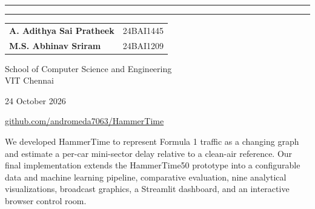 \documentclass[11pt,a4paper,oneside]{report}
\begin{document}
\begin{titlepage}\centering\vspace*{1.1cm}{\large BCSE209L MACHINE LEARNING\\[0.4em] VELLORE INSTITUTE OF TECHNOLOGY CHENNAI\par}
\vspace{1.4cm}\rule{\textwidth}{0.6pt}\vspace{0.5cm}{\Huge\bfseries HammerTime 100\par}\vspace{0.35cm}{\Large Final Project Report\par}
\vspace{0.55cm}{\large A Dynamic Spatio Temporal Graph Neural Network for Formula 1 Traffic Delay Estimation\par}\vspace{0.45cm}{\normalsize Completed implementation and web application\par}
\vspace{0.45cm}{\normalsize Final case study: 2023 Monza Grand Prix\\Historical baseline: 2021 Abu Dhabi Grand Prix\par}\vspace{0.5cm}\rule{\textwidth}{0.6pt}\vfill
\begin{tabular}{@{}ll@{}}\textbf{A. Adithya Sai Pratheek} & 24BAI1445 \\
\textbf{M.S. Abhinav Sriram} & 24BAI1209\end{tabular}\par\vspace{1.4cm}School of Computer Science and Engineering\\VIT Chennai\par\vspace{0.4cm}24 October 2026\par\vspace{0.3cm}\href{https://github.com/andromeda7063/HammerTime}{github.com/andromeda7063/HammerTime}\par\vfill\end{titlepage}

We developed HammerTime to represent Formula 1 traffic as a changing graph and estimate a per-car mini-sector delay relative to a clean-air reference. Our final implementation extends the HammerTime50 prototype into a configurable data and machine learning pipeline, comparative evaluation, nine analytical visualizations, broadcast graphics, a Streamlit dashboard, and an interactive browser control room.
\end{document}
